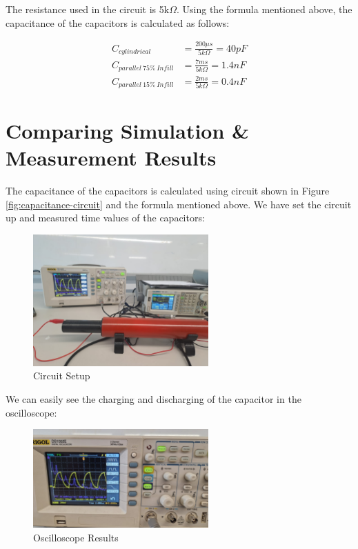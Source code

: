 The resistance used in the circuit is 5k$\Omega$. Using the formula mentioned above, the capacitance of the capacitors is calculated as follows:

\begin{align*}
    C_{cylindrical} &= \frac{200\mu s}{5k\Omega} = \boxed{40pF} \\
    C_{parallel~75\%~Infill} &= \frac{7ms}{5k\Omega} = \boxed{1.4nF} \\
    C_{parallel~15\%~Infill} &= \frac{2ms}{5k\Omega} = \boxed{0.4nF}
\end{align*}

\section{Comparing Simulation \& Measurement Results}

The capacitance of the capacitors is calculated using circuit shown in Figure \ref{fig:capacitance-circuit} and the formula mentioned above. We have set the circuit up and measured time values of the capacitors:

\begin{figure}[h]
    \centering
    \includegraphics[width=0.6\textwidth]{assets/2WhatsApp Image 2024-04-18 at 20.32.11.jpeg}
    \caption{Circuit Setup}
    \label{fig:circuit-setup}
\end{figure}

\newpage
\thispagestyle{plain}

We can easily see the charging and discharging of the capacitor in the oscilloscope:

\begin{figure}[h]
    \centering
    \includegraphics[width=0.6\textwidth]{assets/WhatsApp Image 2024-04-16 at 18.20.12 (2).jpeg}
    \caption{Oscilloscope Results}
    \label{fig:oscilloscope-results}
\end{figure}

